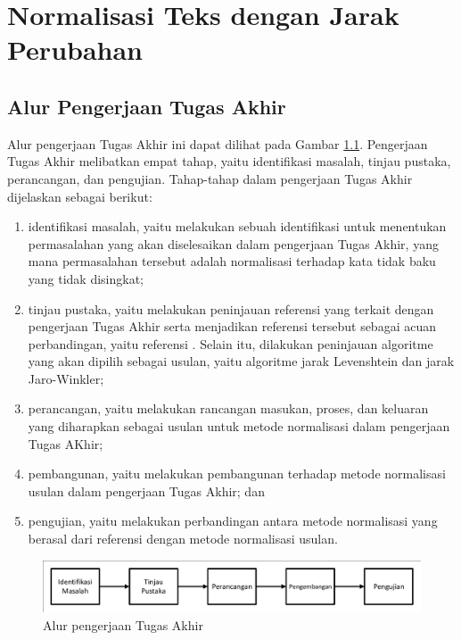 \chapter{Normalisasi Teks dengan Jarak Perubahan}

\section{Alur Pengerjaan Tugas Akhir}

Alur pengerjaan Tugas Akhir ini dapat dilihat pada Gambar \ref{fig:alur_pengerjaan}. Pengerjaan Tugas Akhir melibatkan empat tahap, yaitu identifikasi masalah, tinjau pustaka, perancangan, dan pengujian. Tahap-tahap dalam pengerjaan Tugas Akhir dijelaskan sebagai berikut:
\begin{enumerate}
	\item identifikasi masalah, yaitu melakukan sebuah identifikasi untuk menentukan permasalahan yang akan diselesaikan dalam pengerjaan Tugas Akhir, yang mana permasalahan tersebut adalah normalisasi terhadap kata tidak baku yang tidak disingkat;
	\item tinjau pustaka, yaitu melakukan peninjauan referensi yang terkait dengan pengerjaan Tugas Akhir serta menjadikan referensi tersebut sebagai acuan perbandingan, yaitu referensi \parencite{saragih2017normalisasi}. Selain itu, dilakukan peninjauan algoritme yang akan dipilih sebagai usulan, yaitu algoritme jarak Levenshtein dan jarak Jaro-Winkler;
	\item perancangan, yaitu melakukan rancangan masukan, proses, dan keluaran yang diharapkan sebagai usulan untuk metode normalisasi dalam pengerjaan Tugas AKhir;
	\item pembangunan, yaitu melakukan pembangunan terhadap metode normalisasi usulan dalam pengerjaan Tugas Akhir; dan
	\item pengujian, yaitu melakukan perbandingan antara metode normalisasi yang berasal dari referensi \parencite{saragih2017normalisasi} dengan metode normalisasi usulan.
\end{enumerate}
\begin{figure}[ht]
	\centering
	\includegraphics[width=\textwidth, trim=2 2 2 2, clip]{resources/3/alur_pengerjaan.pdf}
	\caption{Alur pengerjaan Tugas Akhir}
	\label{fig:alur_pengerjaan}
\end{figure}

